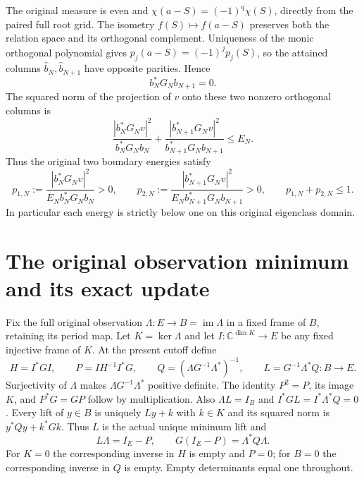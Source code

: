 \documentclass[11pt,a4paper]{article}
\newcommand{\C}{\mathbb C}
\newcommand{\im}{\operatorname{im}}
\begin{document}
The original measure is even and
$\chi(a-S)=(-1)^q\chi(S)$, directly from the paired full root grid.
The isometry $f(S)\mapsto f(a-S)$ preserves both the relation space
and its orthogonal complement. Uniqueness of the monic orthogonal
polynomial gives $p_j(a-S)=(-1)^jp_j(S)$, so the attained columns
$\widehat b_N,\widehat b_{N+1}$ have opposite parities. Hence
\begin{equation}\label{oid:parity}
 b_N^*G_Nb_{N+1}=0.
\end{equation}
The squared norm of the projection of $v$ onto these two nonzero
orthogonal columns is
\[
 \frac{|b_N^*G_Nv|^2}{b_N^*G_Nb_N}
 +\frac{|b_{N+1}^*G_Nv|^2}{b_{N+1}^*G_Nb_{N+1}}\le E_N.
\]
Thus the original two boundary energies satisfy
\begin{equation}\label{oid:energies}
 p_{1,N}:=\frac{|b_N^*G_Nv|^2}{E_Nb_N^*G_Nb_N}>0,\qquad
 p_{2,N}:=\frac{|b_{N+1}^*G_Nv|^2}{E_Nb_{N+1}^*G_Nb_{N+1}}>0,
 \qquad p_{1,N}+p_{2,N}\le1.
\end{equation}
In particular each energy is strictly below one on this original
eigenclass domain.

\section{The original observation minimum and its exact update}

Fix the full original observation $\Lambda:E\to B=\im\Lambda$
in a fixed frame of $B$, retaining its period map. Let $K=\ker\Lambda$
and let $I:\C^{\dim K}\to E$ be any fixed injective frame of $K$.
At the present cutoff define
\begin{equation}\label{oid:observation}
 H=I^*GI,\qquad P=IH^{-1}I^*G,\qquad
 Q=(\Lambda G^{-1}\Lambda^*)^{-1},\qquad
 L=G^{-1}\Lambda^*Q:B\to E.
\end{equation}
Surjectivity of $\Lambda$ makes $\Lambda G^{-1}\Lambda^*$
positive definite. The identity $P^2=P$, its image $K$, and
$P^*G=GP$ follow by multiplication. Also $\Lambda L=I_B$ and
$I^*GL=I^*\Lambda^*Q=0$. Every lift of $y\in B$ is uniquely
$Ly+k$ with $k\in K$ and its squared norm is
$y^*Qy+k^*Gk$. Thus $L$ is the actual unique minimum lift and
\begin{equation}\label{oid:quotient}
 L\Lambda=I_E-P,\qquad
 G(I_E-P)=\Lambda^*Q\Lambda.
\end{equation}
For $K=0$ the corresponding inverse in $H$ is empty and $P=0$;
for $B=0$ the corresponding inverse in $Q$ is empty. Empty
determinants equal one throughout.
\end{document}
